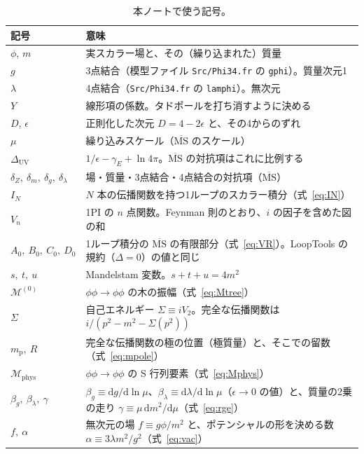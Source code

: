 \documentclass[a4paper,10pt]{ltjsarticle}
\newcommand{\dd}{\mathrm{d}}
\begin{document}
\begin{table}[tbp]
\centering\small
\caption{本ノートで使う記号。}
\label{tab:notation}
\begin{tabularx}{\linewidth}{>{\raggedright\arraybackslash}p{3.3cm}X}
\toprule
\textbf{記号} & \textbf{意味} \\
\midrule
$\phi$, $m$ & 実スカラー場と、その（繰り込まれた）質量 \\
$g$ & 3点結合（模型ファイル \texttt{Src/Phi34.fr} の \texttt{gphi}）。質量次元1 \\
$\lambda$ & 4点結合（\texttt{Src/Phi34.fr} の \texttt{lamphi}）。無次元 \\
$Y$ & 線形項の係数。タドポールを打ち消すように決める \\
$D$, $\epsilon$ & 正則化した次元 $D=4-2\epsilon$ と、その4からのずれ \\
$\mu$ & 繰り込みスケール（$\overline{\mathrm{MS}}$ のスケール） \\
$\Delta_{\mathrm{UV}}$ & $1/\epsilon-\gamma_E+\ln4\pi$。$\overline{\mathrm{MS}}$ の対抗項はこれに比例する \\
$\delta_Z,\ \delta_m,\ \delta_g,\ \delta_\lambda$ & 場・質量・3点結合・4点結合の対抗項（$\overline{\mathrm{MS}}$） \\
$I_N$ & $N$ 本の伝播関数を持つ1ループのスカラー積分（式~\eqref{eq:IN}） \\
$V_n$ & 1PI の $n$ 点関数。Feynman 則のとおり、$i$ の因子を含めた図の和 \\
$A_0,\ B_0,\ C_0,\ D_0$ & 1ループ積分の $\overline{\mathrm{MS}}$ の有限部分（式~\eqref{eq:VR}）。LoopTools の規約（$\Delta=0$）の値と同じ \\
$s,\ t,\ u$ & Mandelstam 変数。$s+t+u=4m^2$ \\
$\mathcal{M}^{(0)}$ & $\phi\phi\to\phi\phi$ の木の振幅（式~\eqref{eq:Mtree}） \\
$\Sigma$ & 自己エネルギー $\Sigma\equiv iV_2$。完全な伝播関数は $i/(p^2-m^2-\Sigma(p^2))$ \\
$m_{\mathrm p},\ R$ & 完全な伝播関数の極の位置（極質量）と、そこでの留数（式~\eqref{eq:mpole}） \\
$\mathcal{M}_{\mathrm{phys}}$ & $\phi\phi\to\phi\phi$ の S 行列要素（式~\eqref{eq:Mphys}） \\
$\beta_g,\ \beta_\lambda,\ \gamma$ & $\beta_g\equiv\dd g/\dd\ln\mu$、$\beta_\lambda\equiv\dd\lambda/\dd\ln\mu$（$\epsilon\to0$ の値）と、質量の2乗の走り $\gamma\equiv\mu\,\dd m^2/\dd\mu$（式~\eqref{eq:rge}） \\
$f,\ \alpha$ & 無次元の場 $f\equiv g\phi/m^2$ と、ポテンシャルの形を決める数 $\alpha\equiv3\lambda m^2/g^2$（式~\eqref{eq:vac}） \\

\end{tabularx}
\end{table}
\end{document}
